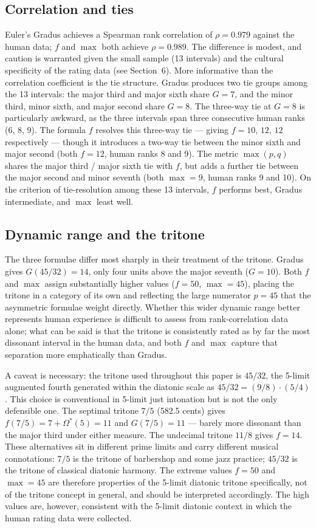 \documentclass[11pt,a4paper]{article}
\newcommand{\Os}{\Omega^{\!*}}
\begin{document}
\subsection*{Correlation and ties}
Euler's Gradus achieves a Spearman rank correlation of $\rho = 0.979$ against
the human data; $f$ and $\max$ both achieve $\rho = 0.989$. The difference is
modest, and caution is warranted given the small sample (13 intervals) and the
cultural specificity of the rating data (see Section~6). More informative than
the correlation coefficient is the tie structure. Gradus produces two tie
groups among the 13 intervals: the major third and major sixth share $G = 7$,
and the minor third, minor sixth, and major second share $G = 8$. The
three-way tie at $G = 8$ is particularly awkward, as the three intervals span
three consecutive human ranks (6, 8, 9). The formula $f$ resolves this
three-way tie --- giving $f = 10$, $12$, $12$ respectively --- though it
introduces a two-way tie between the minor sixth and major second (both $f =
12$, human ranks 8 and 9). The metric $\max(p,q)$ shares the major third /
major sixth tie with $f$, but adds a further tie between the major second and
minor seventh (both $\max = 9$, human ranks 9 and 10). On the criterion of
tie-resolution among these 13 intervals, $f$ performs best, Gradus
intermediate, and $\max$ least well.

\subsection*{Dynamic range and the tritone}
The three formulae differ most sharply in their treatment of the tritone. Gradus
gives $G(45/32) = 14$, only four units above the major seventh ($G = 10$).
Both $f$ and $\max$ assign substantially higher values ($f = 50$, $\max = 45$),
placing the tritone in a category of its own and reflecting the large
numerator $p = 45$ that the asymmetric formulae weight directly. Whether this
wider dynamic range better represents human experience is difficult to assess
from rank-correlation data alone; what can be said is that the tritone is
consistently rated as by far the most dissonant interval in the human data,
and both $f$ and $\max$ capture that separation more emphatically than Gradus.

A caveat is necessary: the tritone used throughout this paper is $45/32$, the
5-limit augmented fourth generated within the diatonic scale as
$45/32 = (9/8) \cdot (5/4)$. This choice is conventional in 5-limit just
intonation but is not the only defensible one. The septimal tritone $7/5$
(582.5 cents) gives $f(7/5) = 7 + \Os(5) = 11$ and $G(7/5) = 11$ --- barely
more dissonant than the major third under either measure. The undecimal tritone
$11/8$ gives $f = 14$. These alternatives sit in different prime limits and
carry different musical connotations: $7/5$ is the tritone of barbershop and
some jazz practice; $45/32$ is the tritone of classical diatonic harmony.
The extreme values $f = 50$ and $\max = 45$ are therefore properties of the
5-limit diatonic tritone specifically, not of the tritone concept in general,
and should be interpreted accordingly. The high values are, however,
consistent with the 5-limit diatonic context in which the human rating data
were collected.
\end{document}
